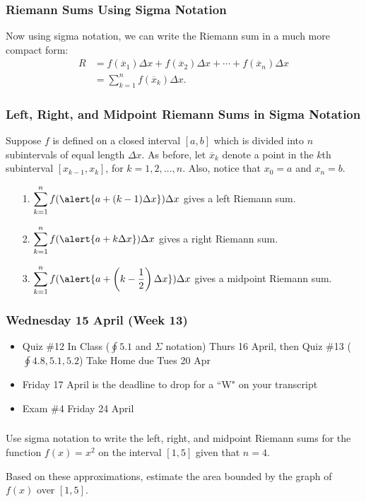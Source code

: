 \documentclass[14pt]{beamer}
\newcommand{\dsum}{\displaystyle\sum}
\begin{document}
\begin{frame}
\frametitle{\small Riemann Sums Using Sigma Notation}
\small
Now using sigma notation, we can write the Riemann sum in a much more compact form:
\begin{align*}
R &= f(\overline{x}_1)\Delta x + f(\overline{x}_2)\Delta x + \cdots + f(\overline{x}_n)\Delta x \\[0.5pc]
 &= \dsum_{k=1}^n f(\overline{x}_k) \Delta x.
 \end{align*}

\end{frame}

\begin{frame}
\frametitle{\small Left, Right, and Midpoint Riemann Sums in Sigma Notation}
\footnotesize
Suppose $f$ is defined on a closed interval $[a,b]$ which is divided into $n$ subintervals of equal length $\Delta x$.  As before, let $\overline{x}_k$ denote a point in the $k$th subinterval $[x_{k-1},x_k]$, for $k=1,2,\dots,n$.  Also, notice that $x_0=a$ and $x_n=b$. 

\begin{itemize}
\item[1.] $\dsum_{k=1}^n f(\alert{a+(k-1)\Delta x}) \Delta x$ gives a left Riemann sum.
\item[2.] $\dsum_{k=1}^n f(\alert{a+k\Delta x}) \Delta x$ gives a right Riemann sum.
\item[3.] $\dsum_{k=1}^n f(\alert{a+\left(k-\dfrac{1}{2}\right)\Delta x}) \Delta x$ gives a midpoint Riemann sum.
\end{itemize}
\end{frame}


\begin{frame}
\frametitle{Wednesday 15 April (Week 13)}
\small
\begin{itemize}
\item Quiz \#12 In Class ($\oint 5.1$ and $\Sigma$ notation) Thurs 16 April, then Quiz \#13 ($\oint 4.8, 5.1, 5.2$) Take Home due Tues 20 Apr
\item \alert{Friday 17 April is the deadline to drop for a ``W" on your transcript}
\item Exam \#4 Friday 24 April
\end{itemize}
\end{frame}

\begin{frame}%
\frametitle{}
\begin{exe} Use sigma notation to write the left, right, and midpoint Riemann sums for the function $f(x)=x^2$ on the interval $[1,5]$ given that $n=4$.

\vspace{1pc}
Based on these approximations, estimate the area bounded by the graph of $f(x)$ over $[1,5]$.
\end{exe}
\end{frame}
\end{document}
